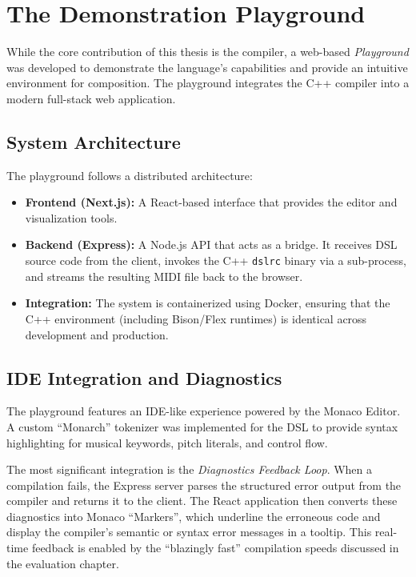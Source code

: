 \section{The Demonstration Playground}\label{sec:implementation-playground}

While the core contribution of this thesis is the compiler, a web-based \textit{Playground} was developed to demonstrate
the language's capabilities and provide an intuitive environment for composition.
The playground integrates the C++ compiler into a modern full-stack web application.

\subsection{System Architecture}\label{subsec:system-architecture}

The playground follows a distributed architecture:
\begin{itemize}
  \item \textbf{Frontend (Next.js):} A React-based interface that provides the editor and visualization tools.
  \item \textbf{Backend (Express):} A Node.js API that acts as a bridge.
    It receives DSL source code from the client, invokes the C++ \texttt{dslrc} binary via a sub-process, and streams
    the resulting MIDI file back to the browser.
  \item \textbf{Integration:} The system is containerized using Docker, ensuring that the C++ environment (including
    Bison/Flex runtimes) is identical across development and production.
\end{itemize}

\subsection{IDE Integration and Diagnostics}\label{subsec:ide-integration-and-diagnostics}

The playground features an IDE-like experience powered by the Monaco Editor.
A custom ``Monarch'' tokenizer was implemented for the DSL to provide syntax highlighting for musical keywords, pitch
literals, and control flow.

The most significant integration is the \textit{Diagnostics Feedback Loop}.
When a compilation fails, the Express server parses the structured error output from the compiler and returns it to the
client.
The React application then converts these diagnostics into Monaco ``Markers'', which underline the erroneous code and
display the compiler's semantic or syntax error messages in a tooltip.
This real-time feedback is enabled by the ``blazingly fast'' compilation speeds discussed in the evaluation chapter.

